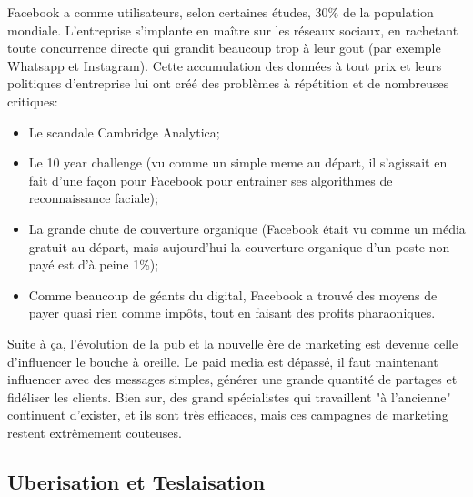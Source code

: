 Facebook a comme utilisateurs, selon certaines études, 30\% de la population mondiale. L'entreprise s'implante en maître sur les réseaux sociaux, en rachetant toute concurrence directe qui grandit beaucoup trop à leur gout (par exemple Whatsapp et Instagram). Cette accumulation des données à tout prix et leurs politiques d'entreprise lui ont créé des problèmes à répétition et de nombreuses critiques:

\begin{itemize}
    \item Le scandale Cambridge Analytica;
    \item Le 10 year challenge (vu comme un simple meme au départ, il s'agissait en fait d'une façon pour Facebook pour entrainer ses algorithmes de reconnaissance faciale);
    \item La grande chute de couverture organique (Facebook était vu comme un média gratuit au départ, mais aujourd'hui la couverture organique d'un poste non-payé est d'à peine 1\%);
    \item Comme beaucoup de géants du digital, Facebook a trouvé des moyens de payer quasi rien comme impôts, tout en faisant des profits pharaoniques.\\
\end{itemize}

Suite à ça, l'évolution de la pub et la nouvelle ère de marketing est devenue celle d'influencer le bouche à oreille. Le paid media est dépassé, il faut maintenant influencer avec des messages simples, générer une grande quantité de partages et fidéliser les clients. Bien sur, des grand spécialistes qui travaillent "à l'ancienne" continuent d'exister, et ils sont très efficaces, mais ces campagnes de marketing restent extrêmement couteuses.

\subsection{Uberisation et Teslaisation}

